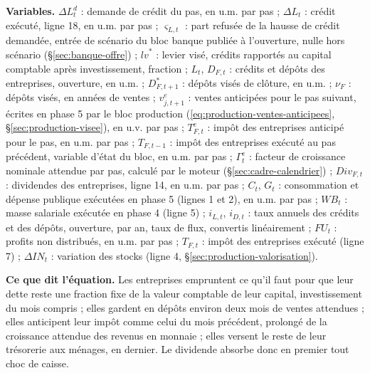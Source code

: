 \documentclass[11pt,a4paper]{article}
\newcommand{\variables}{\par\noindent\textbf{Variables.} }
\newcommand{\sens}{\par\noindent\textbf{Ce que dit l'équation.} }
\begin{document}
\begin{proposee}
\variables $\Delta L^d_t$ : demande de crédit du pas, en u.m. par pas ; $\Delta L_t$ : crédit exécuté, ligne 18, en u.m. par pas ; $\varsigma_{L,t}$ : part refusée de la hausse de crédit demandée, entrée de scénario du bloc banque publiée à l'ouverture, nulle hors scénario (\S\ref{sec:banque-offre}) ; $\mathit{lv}^\ast$ : levier visé, crédits rapportés au capital comptable après investissement, fraction ; $L_t$, $D_{F,t}$ : crédits et dépôts des entreprises, ouverture, en u.m. ; $D^\ast_{F,t+1}$ : dépôts visés de clôture, en u.m. ; $\nu_F$ : dépôts visés, en années de ventes ; $v^e_{j,t+1}$ : ventes anticipées pour le pas suivant, écrites en phase 5 par le bloc production (\eqref{eq:production-ventes-anticipees}, \S\ref{sec:production-visee}), en u.v. par pas ; $T^e_{F,t}$ : impôt des entreprises anticipé pour le pas, en u.m. par pas ; $T_{F,t-1}$ : impôt des entreprises exécuté au pas précédent, variable d'état du bloc, en u.m. par pas ; $\Gamma^e_t$ : facteur de croissance nominale attendue par pas, calculé par le moteur (\S\ref{sec:cadre-calendrier}) ; $\mathit{Div}_{F,t}$ : dividendes des entreprises, ligne 14, en u.m. par pas ; $C_t$, $G_t$ : consommation et dépense publique exécutées en phase 5 (lignes 1 et 2), en u.m. par pas ; $\mathit{WB}_t$ : masse salariale exécutée en phase 4 (ligne 5) ; $i_{L,t}$, $i_{D,t}$ : taux annuels des crédits et des dépôts, ouverture, par an, taux de flux, convertis linéairement ; $\mathit{FU}_t$ : profits non distribués, en u.m. par pas ; $T_{F,t}$ : impôt des entreprises exécuté (ligne 7) ; $\Delta\mathit{IN}_t$ : variation des stocks (ligne 4, \S\ref{sec:production-valorisation}).
\sens Les entreprises empruntent ce qu'il faut pour que leur dette reste une fraction fixe de la valeur comptable de leur capital, investissement du mois compris ; elles gardent en dépôts environ deux mois de ventes attendues ; elles anticipent leur impôt comme celui du mois précédent, prolongé de la croissance attendue des revenus en monnaie ; elles versent le reste de leur trésorerie aux ménages, en dernier. Le dividende absorbe donc en premier tout choc de caisse.

\end{proposee}
\end{document}
